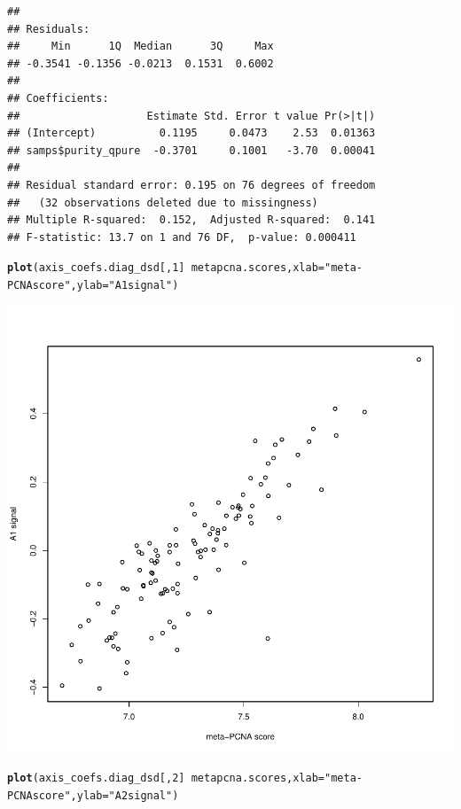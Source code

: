 \documentclass{article}\usepackage[]{graphicx}\usepackage[]{color}
\makeatletter
\def\maxwidth{ %
  \ifdim\Gin@nat@width>\linewidth
    \linewidth
  \else
    \Gin@nat@width
  \fi
}
\newcommand{\hlnum}[1]{\textcolor[rgb]{0.686,0.059,0.569}{#1}}%
\newcommand{\hlstr}[1]{\textcolor[rgb]{0.192,0.494,0.8}{#1}}%
\newcommand{\hlopt}[1]{\textcolor[rgb]{0,0,0}{#1}}%
\newcommand{\hlstd}[1]{\textcolor[rgb]{0.345,0.345,0.345}{#1}}%
\newcommand{\hlkwc}[1]{\textcolor[rgb]{0.333,0.667,0.333}{#1}}%
\newcommand{\hlkwd}[1]{\textcolor[rgb]{0.737,0.353,0.396}{\textbf{#1}}}%
\newenvironment{kframe}{%
 \def\at@end@of@kframe{}%
 \ifinner\ifhmode%
  \def\at@end@of@kframe{\end{minipage}}%
  \begin{minipage}{\columnwidth}%
 \fi\fi%
 \def\FrameCommand##1{\hskip\@totalleftmargin \hskip-\fboxsep
 \colorbox{shadecolor}{##1}\hskip-\fboxsep
     \hskip-\linewidth \hskip-\@totalleftmargin \hskip\columnwidth}%
 \MakeFramed {\advance\hsize-\width
   \@totalleftmargin\z@ \linewidth\hsize
   \@setminipage}}%
 {\par\unskip\endMakeFramed%
 \at@end@of@kframe}
\newenvironment{knitrout}{}{} %
\makeatother
\begin{document}
\begin{knitrout}
\begin{kframe}
\begin{verbatim}
## 
## Residuals:
##     Min      1Q  Median      3Q     Max 
## -0.3541 -0.1356 -0.0213  0.1531  0.6002 
## 
## Coefficients:
##                    Estimate Std. Error t value Pr(>|t|)
## (Intercept)          0.1195     0.0473    2.53  0.01363
## samps$purity_qpure  -0.3701     0.1001   -3.70  0.00041
## 
## Residual standard error: 0.195 on 76 degrees of freedom
##   (32 observations deleted due to missingness)
## Multiple R-squared:  0.152,	Adjusted R-squared:  0.141 
## F-statistic: 13.7 on 1 and 76 DF,  p-value: 0.000411
\end{verbatim}
\begin{alltt}
\hlkwd{plot}\hlstd{(axis_coefs.diag_dsd[,} \hlnum{1}\hlstd{]} \hlopt{~} \hlstd{metapcna.scores,} \hlkwc{xlab} \hlstd{=} \hlstr{"meta-PCNA score"}\hlstd{,} \hlkwc{ylab} \hlstd{=} \hlstr{"A1 signal"}\hlstd{)}
\end{alltt}
\end{kframe}

{\centering \includegraphics[width=\maxwidth]{figure/nmf-msigdb-cor-plots-7} 

}


\begin{kframe}\begin{alltt}
\hlkwd{plot}\hlstd{(axis_coefs.diag_dsd[,} \hlnum{2}\hlstd{]} \hlopt{~} \hlstd{metapcna.scores,} \hlkwc{xlab} \hlstd{=} \hlstr{"meta-PCNA score"}\hlstd{,} \hlkwc{ylab} \hlstd{=} \hlstr{"A2 signal"}\hlstd{)}
\end{alltt}
\end{kframe}


\end{knitrout}
\end{document}
